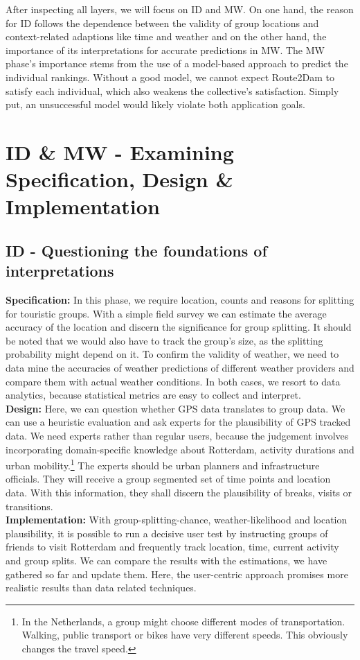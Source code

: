 \documentclass[11pt,a4paper,oneside]{article}
\begin{document}
After inspecting all layers, we will focus on ID and MW. On one hand, the reason for ID follows the dependence between the validity of group locations and context-related adaptions like time and weather and on the other hand, the importance of its interpretations for accurate predictions in MW. The MW phase's importance stems from the use of a model-based approach to predict the individual rankings. Without a good model, we cannot expect Route2Dam to satisfy each individual, which also weakens the collective's satisfaction.\cite{CITE} Simply put, an unsuccessful model would likely violate both application goals.    

\section{ID \& MW - Examining Specification, Design \& Implementation}

\subsection{ID - Questioning the foundations of interpretations}
\textbf{Specification:} In this phase, we require location, counts and reasons for splitting for touristic groups. With a simple field survey we can estimate the average accuracy of the location and discern the significance for group splitting. It should be noted that we would also have to track the group's size, as the splitting probability might depend on it. To confirm the validity of weather, we need to data mine the accuracies of weather predictions of different weather providers and compare them with actual weather conditions. In both cases, we resort to data analytics, because statistical metrics are easy to collect and interpret.\\ 
\textbf{Design:} Here, we can question whether GPS data translates to group data. We can use a heuristic evaluation and ask experts for the plausibility of GPS tracked data. We need experts rather than regular users, because the judgement involves incorporating domain-specific knowledge about Rotterdam, activity durations and urban mobility.\footnote{In the Netherlands, a group might choose different modes of transportation. Walking, public transport or bikes have very different speeds.\cite{CITE} This obviously changes the travel speed.} The experts should be urban planners and infrastructure officials. They will receive a group segmented set of time points and location data. With this information, they shall discern the plausibility of breaks, visits or transitions.  \\
\textbf{Implementation:} With group-splitting-chance, weather-likelihood and location plausibility, it is possible to run a decisive user test by instructing groups of friends to visit Rotterdam and frequently track location, time, current activity and group splits. We can compare the results with the estimations, we have gathered so far and update them. Here, the user-centric approach promises more realistic results than data related techniques.
\end{document}
